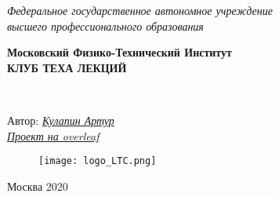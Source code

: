 \begin{titlepage}
	\clearpage\thispagestyle{empty}
	\centering
	
	\textit{Федеральное государственное автономное учреждение \\
		высшего профессионального образования}
	\vspace{0.5ex}
	
	\textbf{Московский Физико-Технический Институт \\ КЛУБ ТЕХА ЛЕКЦИЙ}
	\vspace{20ex}
	\vspace{13ex}
	
	\\
	
	\vspace{1ex}
	Автор: \href{https://vk.com/kulart00}{\textit{Кулапин Артур}}
	\\
	\href{https://www.overleaf.com/read/hgdqksrpzrbt}{\textit{Проект на overleaf}}
	
	\begin{figure}[!ht]
		\centering
		\texttt{[image: logo\_LTC.png]}
		\label{fig:my_label}
	\end{figure}

	\vfill
	Москва 2020 
	\pagebreak
	
\end{titlepage}
